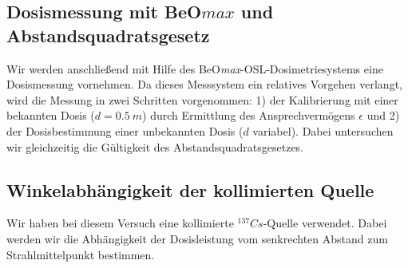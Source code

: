 \subsection{Dosismessung mit BeO$max$ und Abstandsquadratsgesetz}
Wir werden anschließend mit Hilfe des BeO\textit{max}-OSL-Dosimetriesystems eine Dosismessung vornehmen. Da dieses Messsystem ein relatives Vorgehen verlangt, wird die Messung in zwei Schritten vorgenommen: 1) der Kalibrierung mit einer bekannten Dosis ($d=0.5\ m$) durch Ermittlung des Ansprechvermögens $\epsilon$ und 2) der Dosisbestimmung einer unbekannten Dosis ($d$ variabel). Dabei untersuchen wir gleichzeitig die Gültigkeit des Abstandsquadratsgesetzes.

\subsection{Winkelabhängigkeit der kollimierten Quelle}
Wir haben bei diesem Versuch eine kollimierte $^{137}Cs$-Quelle verwendet. Dabei werden wir die Abhängigkeit der Dosisleistung vom senkrechten Abstand zum Strahlmittelpunkt bestimmen.